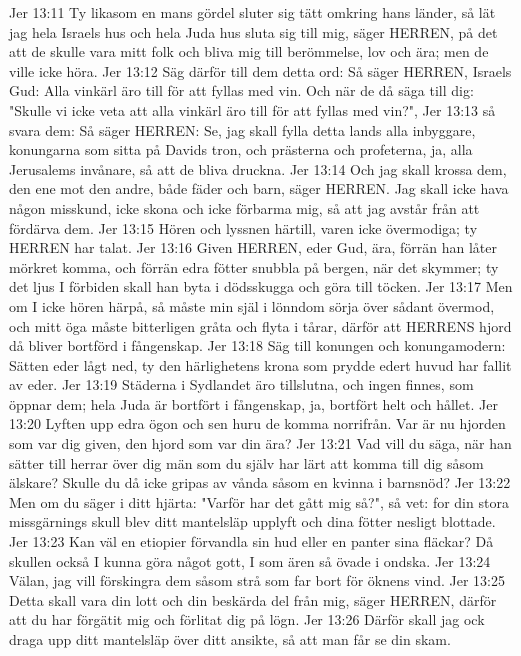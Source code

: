 Jer 13:11  Ty likasom en mans gördel sluter sig tätt omkring hans länder, så lät jag hela Israels hus och hela Juda hus sluta sig till mig, säger HERREN, på det att de skulle vara mitt folk och bliva mig till berömmelse, lov och ära; men de ville icke höra.
Jer 13:12  Säg därför till dem detta ord: Så säger HERREN, Israels Gud: Alla vinkärl äro till för att fyllas med vin. Och när de då säga till dig: "Skulle vi icke veta att alla vinkärl äro till för att fyllas med vin?",
Jer 13:13  så svara dem: Så säger HERREN: Se, jag skall fylla detta lands alla inbyggare, konungarna som sitta på Davids tron, och prästerna och profeterna, ja, alla Jerusalems invånare, så att de bliva druckna.
Jer 13:14  Och jag skall krossa dem, den ene mot den andre, både fäder och barn, säger HERREN. Jag skall icke hava någon misskund, icke skona och icke förbarma mig, så att jag avstår från att fördärva dem.
Jer 13:15  Hören och lyssnen härtill, varen icke övermodiga; ty HERREN har talat.
Jer 13:16  Given HERREN, eder Gud, ära, förrän han låter mörkret komma, och förrän edra fötter snubbla på bergen, när det skymmer; ty det ljus I förbiden skall han byta i dödsskugga och göra till töcken.
Jer 13:17  Men om I icke hören härpå, så måste min själ i lönndom sörja över sådant övermod, och mitt öga måste bitterligen gråta och flyta i tårar, därför att HERRENS hjord då bliver bortförd i fångenskap.
Jer 13:18  Säg till konungen och konungamodern: Sätten eder lågt ned, ty den härlighetens krona som prydde edert huvud har fallit av eder.
Jer 13:19  Städerna i Sydlandet äro tillslutna, och ingen finnes, som öppnar dem; hela Juda är bortfört i fångenskap, ja, bortfört helt och hållet.
Jer 13:20  Lyften upp edra ögon och sen huru de komma norrifrån. Var är nu hjorden som var dig given, den hjord som var din ära?
Jer 13:21  Vad vill du säga, när han sätter till herrar över dig män som du själv har lärt att komma till dig såsom älskare? Skulle du då icke gripas av vånda såsom en kvinna i barnsnöd?
Jer 13:22  Men om du säger i ditt hjärta: "Varför har det gått mig så?", så vet: for din stora missgärnings skull blev ditt mantelsläp upplyft och dina fötter nesligt blottade.
Jer 13:23  Kan väl en etiopier förvandla sin hud eller en panter sina fläckar? Då skullen också I kunna göra något gott, I som ären så övade i ondska.
Jer 13:24  Välan, jag vill förskingra dem såsom strå som far bort för öknens vind.
Jer 13:25  Detta skall vara din lott och din beskärda del från mig, säger HERREN, därför att du har förgätit mig och förlitat dig på lögn.
Jer 13:26  Därför skall jag ock draga upp ditt mantelsläp över ditt ansikte, så att man får se din skam.
